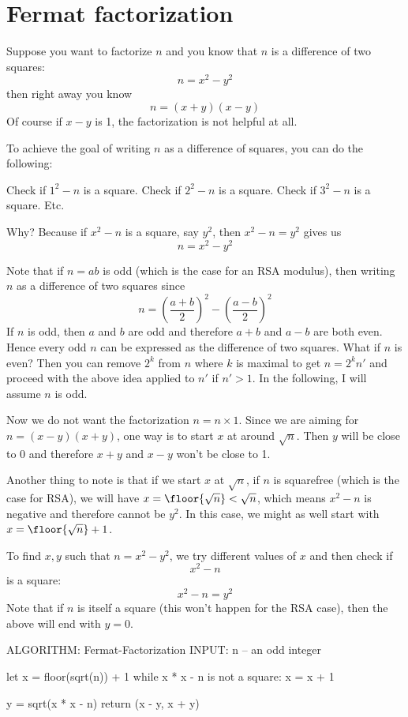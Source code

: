 \section{Fermat factorization}

Suppose you want to factorize $n$ and you know that
$n$ is a difference of two squares:
\[
n = x^2 - y^2
\]
then right away you know
\[
n = (x + y)(x - y)
\]
Of course if $x - y$ is 1, the factorization is not
helpful at all.

To achieve the goal of writing $n$ as a difference of squares,
you can do the following:
\begin{tightlist}
  \li Check if $1^2 - n$ is a square.
  \li Check if $2^2 - n$ is a square.
  \li Check if $3^2 - n$ is a square.
  \li Etc.
\end{tightlist}
Why?
Because if $x^2 - n$ is a square, say $y^2$, then
$x^2 - n = y^2$ gives us
\[
n = x^2 - y^2
\]

Note that if $n = ab$ is odd (which is the case for an RSA modulus),
then writing $n$ as a difference of two squares since
\[
  n
  =
  \left(\frac{a + b}{2}\right)^2
  -
  \left(\frac{a - b}{2}\right)^2
\]
If $n$ is odd, then $a$ and $b$ are odd and
therefore $a + b$ and $a - b$ are both even.
Hence every odd $n$ can be expressed as the
difference of two squares.
What if $n$ is even?
Then you can remove $2^k$ from $n$
where $k$ is maximal to get
$n = 2^k n'$ and proceed with the above
idea applied to $n'$ if $n' > 1$.
In the following, I will assume $n$ is odd.

Now we do not want the factorization $n = n \times 1$.
Since we are aiming for $n = (x-y)(x+y)$,
one way is to start $x$ at around $\sqrt{n}$.
Then $y$ will be close to $0$ and therefore $x+y$ and $x-y$ won't be close to 1.

Another thing to note is that if we start $x$ at $\sqrt{n}$,
if $n$ is squarefree (which is the case for RSA),
we will have $x = \floor{\sqrt{n}} < \sqrt{n}$,
which means $x^2 - n$ is negative and therefore cannot be $y^2$.
In this case, we might as well start with
$x = \floor{\sqrt{n}} + 1$.

To find $x,y$ such that $n = x^2 - y^2$,
we try different values of $x$ and then check if
\[
  x^2 - n
\]
is a square:
\[
  x^2 - n = y^2
\]
Note that if $n$ is itself a square (this won't happen for the RSA case),
then the above will end with $y = 0$.

\begin{console}[fontsize=\footnotesize]
ALGORITHM: Fermat-Factorization
INPUT: n -- an odd integer

let x = floor(sqrt(n)) + 1
while x * x - n is not a square:
    x = x + 1

y = sqrt(x * x - n)
return (x - y, x + y)    
\end{console}

